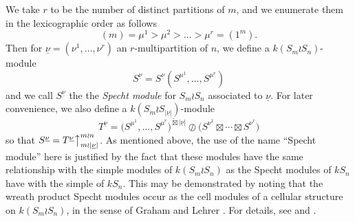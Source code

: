 \documentclass[10pt]{article}
\theoremstyle{definition}
\newcommand{\ul}[1]{\underline{#1}}
\begin{document}
We take $r$ to be the number of distinct partitions of $m$, and we enumerate them in the lexicographic order as follows
\[ (m) = \mu^1 > \mu^2 > \ldots > \mu^r = (1^m). \]
Then for $\ul{\nu}=(\nu^1,\ldots,\nu^r)$ an $r$-multipartition of $n$, we define a $k(S_m{\wr}S_n)$-module
\[
	S^{\ul{\nu}} =S^{\ul{\nu}}(S^{\mu^1},\ldots,S^{\mu^r})
\]
and we call $S^{\ul{\nu}}$ the the \textit{Specht module} for $S_m{\wr}S_n$ associated to $\ul{\nu}$. For later convenience, we also
define a $k(S_m \wr S_{|\ul{\nu}|})$-module
\[
	T^{\ul{\nu}} = \bigl(S^{\mu^1},\ldots,S^{\mu^r}\bigr)^{\widetilde\boxtimes |\ul{\nu}|}{\oslash}
	\bigl(S^{\nu^1}\boxtimes\cdots\boxtimes S^{\nu^r}\bigr)
\]
so that $S^{\ul{\nu}} = T^{\ul{\nu}}\bigr\uparrow^{m{\wr}n}_{m{\wr}|\ul{\nu}|}$.
As mentioned above, the use of the name ``Specht module'' here is justified by the fact that these modules have the same relationship
with the simple modules of $k(S_m \wr S_n)$ as the Specht modules of $kS_n$ have with the simple of $kS_n$. This may be demonstrated by
noting that the wreath product Specht modules occur as the cell modules of a cellular structure on $k(S_m \wr S_n)$, in the sense of
Graham and Lehrer \cite{GLCA}. For details, see \cite{GCSWPA} and \cite[Section 5.5]{PHDTHES}.
\end{document}
